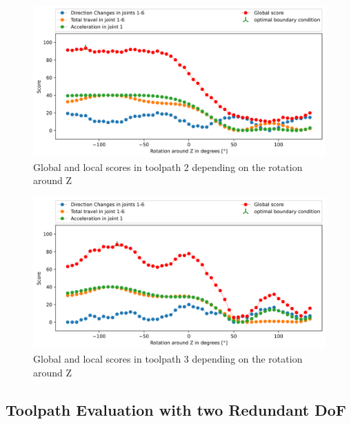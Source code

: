 \begin{figure}[H]
\centerline{\includegraphics[width=1\textwidth]{figures/best_c_2_combi.png}}
\caption{Global and local scores in toolpath 2 depending on the rotation around Z}
\label{TP2_combi}
\end{figure}
\begin{figure}[H]
\centerline{\includegraphics[width=1\textwidth]{figures/best_c_3_combi.png}}
\caption{Global and local scores in toolpath 3 depending on the rotation around Z}
\label{TP3_combi}
\end{figure}
\newpage

\subsection{Toolpath Evaluation with two Redundant DoF}\label{2RDOF}

